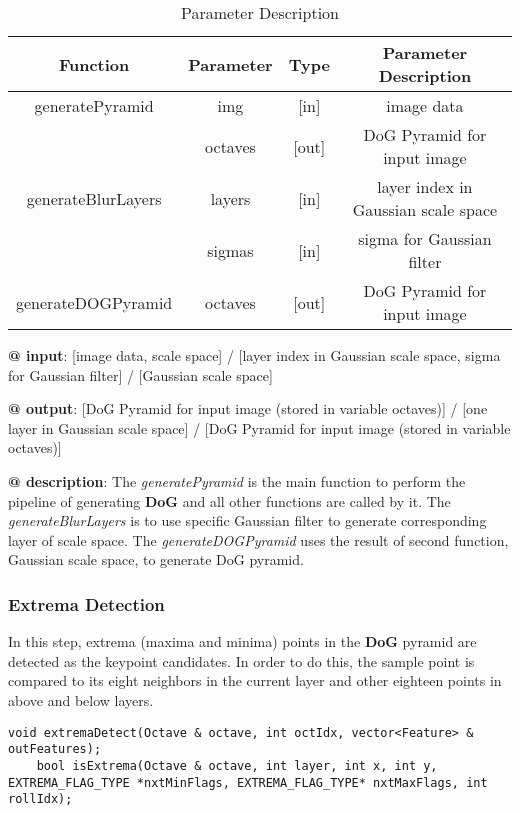 \documentclass[paper=a4, fontsize=11pt]{scrartcl} %
\numberwithin{equation}{section} %
\numberwithin{figure}{section} %
\numberwithin{table}{section} %
\begin{document}
\begin{table}[h]
    \centering
    \begin{tabular}{|c|c|c|c|}
        \hline
        \textbf{Function} & \textbf{Parameter} & \textbf{Type} & \textbf{Parameter Description} \\\hline
        generatePyramid & img & [in] & image data  \\
                        & octaves &[out] & DoG Pyramid for input image \\\hline
     generateBlurLayers & layers & [in] & layer index in Gaussian scale space  \\
                        & sigmas & [in] & sigma for Gaussian filter\\\hline
     generateDOGPyramid & octaves & [out] & DoG Pyramid for input image\\\hline
    \end{tabular}
    \caption{Parameter Description}\label{nolock}
\end{table}

\textbf{@ input}: [image data, scale space] / [layer index in Gaussian scale space, sigma for Gaussian filter] / [Gaussian scale space]

\textbf{@ output}: [DoG Pyramid for input image (stored in variable octaves)] / [one layer in Gaussian scale space] / [DoG Pyramid for input image (stored in variable octaves)]


\textbf{@ description}: The \textsl{generatePyramid} is the main function to perform the pipeline of generating \textbf{DoG} and all other functions are called by it. The \textsl{generateBlurLayers} is to use specific Gaussian filter to generate corresponding layer of scale space. The \textsl{generateDOGPyramid} uses the result of second function, Gaussian scale space, to generate DoG pyramid.

\subsubsection{Extrema Detection}

In this step, extrema (maxima and minima) points in the \textbf{DoG} pyramid are detected as the keypoint candidates. In order to do this, the sample point is compared to its eight neighbors in the current layer and other eighteen points in above and below layers.

\begin{lstlisting}
void extremaDetect(Octave & octave, int octIdx, vector<Feature> & outFeatures);
    bool isExtrema(Octave & octave, int layer, int x, int y, EXTREMA_FLAG_TYPE *nxtMinFlags, EXTREMA_FLAG_TYPE* nxtMaxFlags, int rollIdx);
\end{lstlisting}
\end{document}
